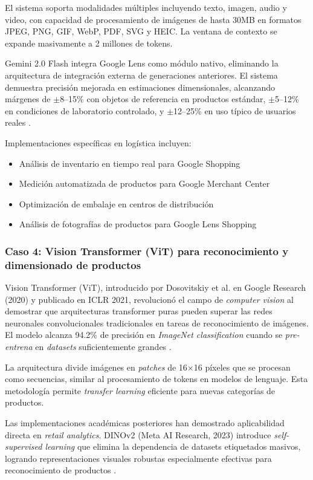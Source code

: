 El sistema soporta modalidades múltiples incluyendo texto, imagen, audio y video, con capacidad de procesamiento de imágenes de hasta 30MB en formatos JPEG, PNG, GIF, WebP, PDF, SVG y HEIC. La ventana de contexto se expande masivamente a 2 millones de tokens.

Gemini 2.0 Flash integra Google Lens como módulo nativo, eliminando la arquitectura de integración externa de generaciones anteriores. El sistema demuestra precisión mejorada en estimaciones dimensionales, alcanzando márgenes de $\pm$8--15\% con objetos de referencia en productos estándar, $\pm$5--12\% en condiciones de laboratorio controlado, y $\pm$12--25\% en uso típico de usuarios reales \cite{Team2025}.

Implementaciones específicas en logística incluyen:
\begin{itemize}
    \item Análisis de inventario en tiempo real para Google Shopping
    \item Medición automatizada de productos para Google Merchant Center
    \item Optimización de embalaje en centros de distribución
    \item Análisis de fotografías de productos para Google Lens Shopping
\end{itemize}

\subsubsection{Caso 4: Vision Transformer (ViT) para reconocimiento y dimensionado de productos}

Vision Transformer (ViT), introducido por Dosovitskiy et al. en Google Research (2020) y publicado en ICLR 2021, revolucionó el campo de \textit{computer vision} al demostrar que arquitecturas transformer puras pueden superar las redes neuronales convolucionales tradicionales en tareas de reconocimiento de imágenes. El modelo alcanza 94.2\% de precisión en \textit{ImageNet classification} cuando se \textit{pre-entrena} en \textit{datasets} suficientemente grandes \cite{Dosovitskiy2020}.

La arquitectura divide imágenes en \textit{patches} de 16$\times$16 píxeles que se procesan como secuencias, similar al procesamiento de tokens en modelos de lenguaje. Esta metodología permite \textit{transfer learning} eficiente para nuevas categorías de productos.

Las implementaciones académicas posteriores han demostrado aplicabilidad directa en \textit{retail analytics}. DINOv2 (Meta AI Research, 2023) introduce \textit{self-supervised learning} que elimina la dependencia de datasets etiquetados masivos, logrando representaciones visuales robustas especialmente efectivas para reconocimiento de productos \cite{Oquab2024}.

